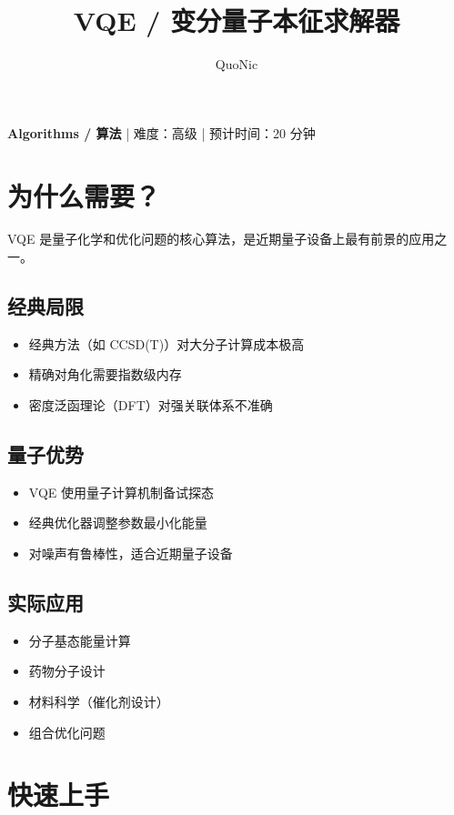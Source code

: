\documentclass[12pt,a4paper]{article}
\title{VQE / 变分量子本征求解器}
\author{QuoNic}
\date{}
\begin{document}
\maketitle

\begin{center}
\textbf{Algorithms / 算法} | 难度：高级 | 预计时间：20 分钟
\end{center}

\tableofcontents
\newpage

\section{为什么需要？}

VQE 是量子化学和优化问题的核心算法，是近期量子设备上最有前景的应用之一。

\subsection{经典局限}
\begin{itemize}
  \item 经典方法（如 CCSD(T)）对大分子计算成本极高
  \item 精确对角化需要指数级内存
  \item 密度泛函理论（DFT）对强关联体系不准确
\end{itemize}

\subsection{量子优势}
\begin{itemize}
  \item VQE 使用量子计算机制备试探态
  \item 经典优化器调整参数最小化能量
  \item 对噪声有鲁棒性，适合近期量子设备
\end{itemize}

\subsection{实际应用}
\begin{itemize}
  \item 分子基态能量计算
  \item 药物分子设计
  \item 材料科学（催化剂设计）
  \item 组合优化问题
\end{itemize}

\section{快速上手}
\end{document}
